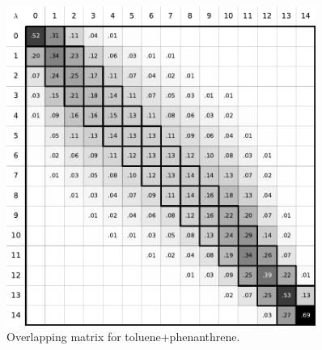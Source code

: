 \documentclass[
	12pt,				%
	openright,			%
	oneside,			%
	a4paper,			%
	english,			%
	brazil				%
	]{abntex2}
\begin{document}
\begin{apendicesenv}
\begin{figure}[H]
	\centering
	\includegraphics[width=0.9\textwidth]{Figures/otol_phen}
	\caption{Overlapping matrix for toluene+phenanthrene.}
\end{figure}


\end{apendicesenv}
\end{document}
